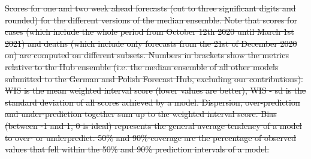 \documentclass[10pt,letterpaper]{article}
\providecommand{\DIFdeltex}[1]{{\protect\color{red}\sout{#1}}}                      %
\providecommand{\DIFdelFL}[1]{\DIFdel{#1}} %
\providecommand{\DIFdel}[1]{\texorpdfstring{\DIFdeltex{#1}}{}} %
\begin{document}

{%
\DIFdelFL{Scores for one and two week ahead forecasts (cut to three significant digits and rounded) for the different versions of the median ensemble. Note that scores for cases (which include the whole period from October 12th 2020 until March 1st 2021) and deaths (which include only forecasts from the 21st of December 2020 on) are computed on different subsets. Numbers in brackets show the metrics relative to the Hub ensemble (i.e. the median ensemble of all other models submitted to the German and Polish Forecast Hub, excluding our contributions). WIS is the mean weighted interval score (lower values are better), WIS - sd is the standard deviation of all scores achieved by a model. Dispersion, over-prediction and under-prediction together sum up to the weighted interval score. Bias (between -1 and 1, 0 is ideal) represents the general average tendency of a model to over- or underpredict. 50\% and 90\%-coverage are the percentage of observed values that fell within the 50\% and 90\% prediction intervals of a model.}%
\DIFdelFL{\hspace{\textwidth}}}
\end{document}
